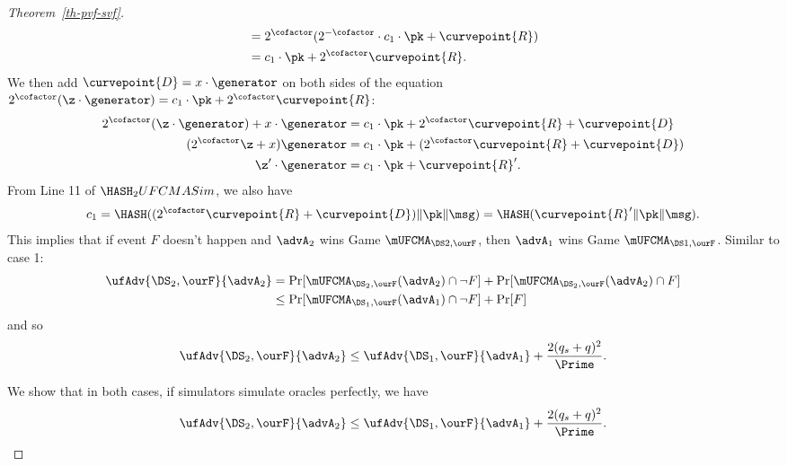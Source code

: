 \begin{proof}[Theorem~\ref{th-pvf-svf}]
\begin{align*}
		&= 2^\cofactor (2^{-\cofactor} \cdot c_1 \cdot\pk + \curvepoint{R})\\
		&=  c_1 \cdot \pk + 2^\cofactor \curvepoint{R}.
	\end{align*}
	We then add $\curvepoint{D} = x \cdot \generator$ on both sides of the equation $2^\cofactor(\z \cdot  \generator) =  c_1 \cdot\pk + 2^\cofactor \curvepoint{R}$:
	\begin{align*} 
		2^\cofactor(\z \cdot  \generator) +  x \cdot \generator &=  c_1 \cdot \pk + 2^\cofactor \curvepoint{R} + \curvepoint{D}\\
		(2^\cofactor \z + x)\generator &=  c_1 \cdot \pk+ (2^\cofactor \curvepoint{R} + \curvepoint{D})\\
		\z' \cdot  \generator &= c_1 \cdot \pk + \curvepoint{R}'.
	\end{align*}
	From Line 11 of $\HASH_2UFCMASim$, we also have
	\[c_1 = \HASH((2^\cofactor\curvepoint{R} + \curvepoint{D}) \|\pk\| \msg) = \HASH(\curvepoint{R}'\|\pk\| \msg).\]
	This implies that if event $F$ doesn't happen and $\advA_2$ wins Game $\mUFCMA_{\DS2,\ourF}$, then $\advA_1$ wins Game $\mUFCMA_{\DS1,\ourF}$. Similar to case 1:
	\begin{align*}
		\ufAdv{\DS_2,\ourF}{\advA_2} &= \Pr[\mUFCMA_{\DS_2,\ourF}(\advA_2) \cap \neg F] +  \Pr[\mUFCMA_{\DS_2,\ourF}(\advA_2) \cap F]\\
		& \leq \Pr[\mUFCMA_{\DS_1,\ourF}(\advA_1) \cap \neg F] + \Pr[F]
	\end{align*}
	and so
	\[\ufAdv{\DS_2,\ourF}{\advA_2} \leq \ufAdv{\DS_1,\ourF}{\advA_1} +  \frac{2(q_s + q)^2}{\Prime}.\]
	
	We show that in both cases, if simulators simulate oracles perfectly, we have
	\[\ufAdv{\DS_2,\ourF}{\advA_2} \leq \ufAdv{\DS_1,\ourF}{\advA_1} +  \frac{2(q_s + q)^2}{\Prime}.\]
	

\end{proof}
